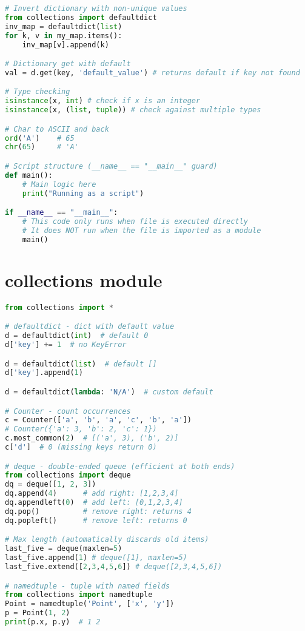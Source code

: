 \documentclass[8pt,landscape]{article}
\begin{document}
\begin{multicols}{3}
\begin{lstlisting}[language=Python]
# Invert dictionary with non-unique values
from collections import defaultdict
inv_map = defaultdict(list)
for k, v in my_map.items():
    inv_map[v].append(k)

# Dictionary get with default
val = d.get(key, 'default_value') # returns default if key not found

# Type checking
isinstance(x, int) # check if x is an integer
isinstance(x, (list, tuple)) # check against multiple types

# Char to ASCII and back
ord('A')    # 65
chr(65)     # 'A'

# Script structure (__name__ == "__main__" guard)
def main():
    # Main logic here
    print("Running as a script")

if __name__ == "__main__":
    # This code only runs when file is executed directly
    # It does NOT run when the file is imported as a module
    main()
\end{lstlisting}

\section*{collections module}
\begin{lstlisting}[language=Python]
from collections import *

# defaultdict - dict with default value
d = defaultdict(int)  # default 0
d['key'] += 1  # no KeyError

d = defaultdict(list)  # default []
d['key'].append(1)

d = defaultdict(lambda: 'N/A')  # custom default

# Counter - count occurrences
c = Counter(['a', 'b', 'a', 'c', 'b', 'a'])
# Counter({'a': 3, 'b': 2, 'c': 1})
c.most_common(2)  # [('a', 3), ('b', 2)]
c['d']  # 0 (missing keys return 0)

# deque - double-ended queue (efficient at both ends)
from collections import deque
dq = deque([1, 2, 3])
dq.append(4)      # add right: [1,2,3,4]
dq.appendleft(0)  # add left: [0,1,2,3,4]
dq.pop()          # remove right: returns 4
dq.popleft()      # remove left: returns 0

# Max length (automatically discards old items)
last_five = deque(maxlen=5)
last_five.append(1) # deque([1], maxlen=5)
last_five.extend([2,3,4,5,6]) # deque([2,3,4,5,6])

# namedtuple - tuple with named fields
from collections import namedtuple
Point = namedtuple('Point', ['x', 'y'])
p = Point(1, 2)
print(p.x, p.y)  # 1 2
\end{lstlisting}


\end{multicols}
\end{document}
